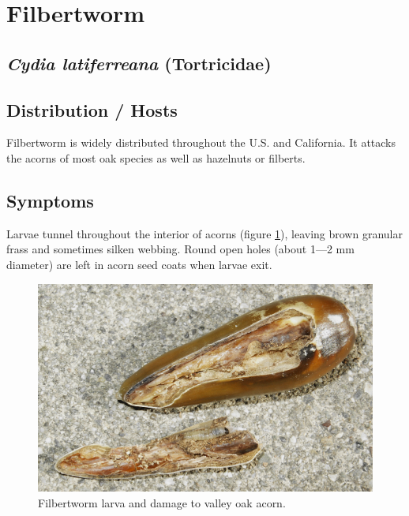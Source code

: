 \documentclass[
]{book}
\begin{document}
\section*{Filbertworm}\label{Filbertworm}

\subsection*{\texorpdfstring{\emph{Cydia latiferreana} (Tortricidae)}{Cydia latiferreana (Tortricidae)}}\label{cydia-latiferreana-tortricidae}

\subsection*{Distribution / Hosts}\label{distribution-hosts-1}

Filbertworm is widely distributed throughout the U.S. and California. It attacks the acorns of most oak species as well as hazelnuts or filberts.

\subsection*{Symptoms}\label{symptoms-1}

Larvae tunnel throughout the interior of acorns (figure \ref{fig:CylaQlPR}), leaving brown granular frass and sometimes silken webbing. Round open holes (about 1---2 mm diameter) are left in acorn seed coats when larvae exit.



\begin{figure}

{\centering \includegraphics[width=0.8\linewidth]{images/Insect-acorn/Cydlat_QL_PR_10-29-2003} 

}

\caption{Filbertworm larva and damage to valley oak acorn.}\label{fig:CylaQlPR}
\end{figure}
\end{document}
